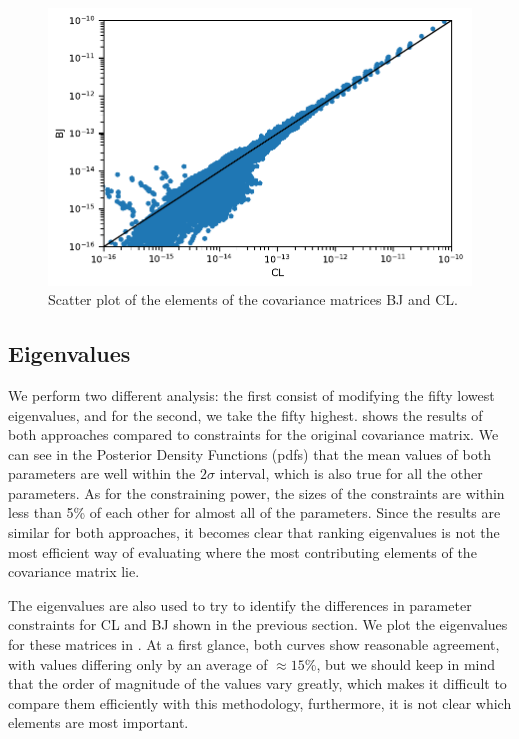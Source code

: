 \documentclass[twocolumn]{\docclass}
\begin{document}
	\begin{figure}
		\includegraphics[width=0.9\columnwidth]{One-to-one-Y3_BJ-CL.pdf}
		\caption{Scatter plot of the elements of the covariance matrices BJ and CL.
			\label{fig:one-to-one}}
	\end{figure}
	
	
	\subsection{Eigenvalues}
	
	We perform two different analysis: the first consist of modifying the fifty lowest eigenvalues, and for the second, we take the fifty highest.   shows the results of both approaches compared to constraints for the original covariance matrix. We can see in the Posterior Density Functions (pdfs) that the mean values of both parameters are well within the $2\sigma$ interval, which is also true for all the other parameters. As for the constraining power, the sizes of the constraints are within less than 5\% of each other for almost all of the parameters. Since the results are similar for both approaches, it becomes clear that ranking eigenvalues is not the most efficient way of evaluating where the most contributing elements of the covariance matrix lie.
	
	The eigenvalues are also used to try to identify the differences in parameter constraints for CL and BJ shown in the previous section. We plot the eigenvalues for these matrices in . At a first glance, both curves show reasonable agreement, with values differing only by an average of $\approx 15 \%$, but we should keep in mind that the order of magnitude of the values vary greatly, which makes it difficult to compare them efficiently with this methodology, furthermore, it is not clear which elements are most important.
	
\end{document}
